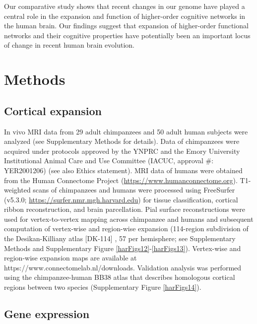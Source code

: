 \begin{refsection}
Our comparative study shows that recent changes in our genome have played a central role in the expansion and function of higher-order cognitive networks in the human brain. Our findings suggest that expansion of higher-order functional networks and their cognitive properties have potentially been an important locus of change in recent human brain evolution.

\section*{Methods}
\subsection*{Cortical expansion}
In vivo MRI data from 29 adult chimpanzees and 50 adult human subjects were analyzed (see Supplementary Methods for details). Data of chimpanzees were acquired under protocols approved by the YNPRC and the Emory University Institutional Animal Care and Use Committee (IACUC, approval \#: YER2001206) (see also Ethics statement). MRI data of humans were obtained from the Human Connectome Project (\url{https://www.humanconnectome.org}). T1-weighted scans of chimpanzees and humans were processed using FreeSurfer (v5.3.0; \url{https://surfer.nmr.mgh.harvard.edu}) for tissue classification, cortical ribbon reconstruction, and brain parcellation. Pial surface reconstructions were used for vertex-to-vertex mapping across chimpanzee and humans and subsequent computation of vertex-wise and region-wise expansion (114-region subdivision of the Desikan-Killiany atlas [DK-114] \citep{DESIKAN2006968,CAMMOUN2012386}, 57 per hemisphere; see Supplementary Methods and Supplementary Figure \ref{harFigs12}-\ref{harFigs13}). Vertex-wise and region-wise expansion maps are available at https://www.connectomelab.nl/downloads. Validation analysis was performed using the chimpanzee-human BB38 atlas that describes homologous cortical regions between two species \citep{Heuvel2019EvolutionaryMI} (Supplementary Figure \ref{harFigs14}).

\subsection*{Gene expression}

\end{refsection}
